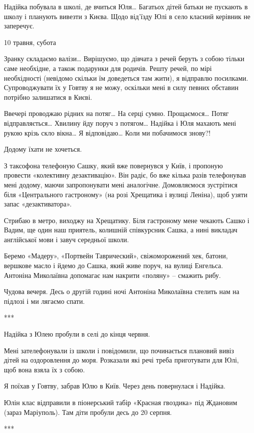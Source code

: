 Надійка побувала в школі, де вчиться Юля… Багатьох дітей батьки не пускають в
школу і планують вивезти з Києва. Щодо від’їзду Юлі в село класний керівник не
заперечує.

10 травня, субота

Зранку складаємо валізи… Вирішуємо, що дівчата з речей беруть з собою тільки
саме необхідне, а також подарунки для родичів. Решту речей, по мірі
необхідності (невідомо скільки їм доведеться там жити), я відправлю посилками.
Супроводжувати їх у Говтву я не можу, оскільки мені в силу певних обставин
потрібно залишатися в Києві.

Ввечері проводжаю рідних на потяг… На серці сумно. Прощаємося… Потяг
відправляється… Хвилину йду поруч з потягом… Надійка і Юля махають мені рукою
крізь скло вікна… Я відповідаю… Коли ми побачимося знову?!

Додому їхати не хочеться.

З таксофона телефоную Сашку, який вже повернувся у Київ, і пропоную провести
«колективну дезактивацію». Він радіє, бо вже кілька разів телефонував мені
додому, маючи запропонувати мені аналогічне. Домовляємося зустрітися біля
«Центрального гастроному» (на розі Хрещатика і вулиці Леніна), щоб узяти запас
«дезактиватора».

Стрибаю в метро, виходжу на Хрещатику. Біля гастроному мене чекають Сашко і
Вадим, ще один наш приятель, колишній співкурсник Сашка, а нині викладач
англійської мови і завуч середньої школи. 

Беремо «Мадеру», «Портвейн Таврический», свіжоморожений хек, батони, вершкове
масло і йдемо до Сашка, який живе поруч, на вулиці Енгельса. Антоніна
Миколаївна допомагає нам накрити «поляну» – смажить рибу. 

Чудова вечеря. Десь о другій годині ночі Антоніна Миколаївна стелить нам на
підлозі і ми лягаємо спати.

***

Надійка з Юлею пробули в селі до кінця червня. 

Мені зателефонували із школи і повідомили, що починається плановий вивіз дітей
на оздоровлення до моря. Розказали які речі треба приготувати для Юлі, щоб вона
взяла їх з собою.

Я поїхав у Говтву, забрав Юлю в Київ. Через день повернулася і Надійка. 

Юлін клас відправили в піонерський табір «Красная гвоздика» під Ждановим (зараз
Маріуполь). Там діти пробули десь до 20 серпня.

***
